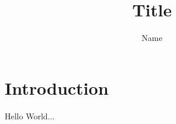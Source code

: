 \documentclass{article}
\title{Title}
\author{Name}
\begin{document}
\maketitle

\section{Introduction}

Hello World...
\end{document}
